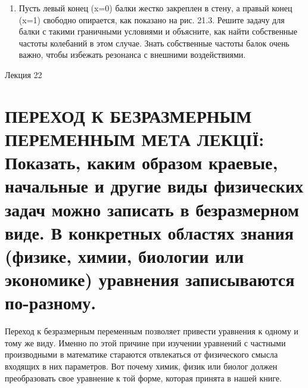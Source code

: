 \documentclass[
  ukrainian,
]{article}
\providecommand{\tightlist}{%
  \setlength{\itemsep}{0pt}\setlength{\parskip}{0pt}}
\begin{document}
\begin{enumerate}
\def\labelenumi{\arabic{enumi}.}
\setcounter{enumi}{3}
\tightlist
\item
  Пусть левый конец (x=0) балки жестко закреплен в стену, а правый конец
  (x=1) свободно опирается, как показано на рис. 21.3. Решите задачу для
  балки с такими граничными условиями и объясните, как найти собственные
  частоты колебаний в этом случае. Знать собственные частоты балок очень
  важно, чтобы избежать резонанса с внешними воздействиями.
\end{enumerate}

Лекция 22

\section{ПЕРЕХОД К БЕЗРАЗМЕРНЫМ ПЕРЕМЕННЫМ МЕТА ЛЕКЦІЇ: Показать, каким
образом краевые, начальные и другие виды физических задач можно записать
в безразмерном виде. В конкретных областях знания (физике, химии,
биологии или экономике) уравнения записываются
по-разному.}\label{ux43fux435ux440ux435ux445ux43eux434-ux43a-ux431ux435ux437ux440ux430ux437ux43cux435ux440ux43dux44bux43c-ux43fux435ux440ux435ux43cux435ux43dux43dux44bux43c-ux43cux435ux442ux430-ux43bux435ux43aux446ux456ux457-ux43fux43eux43aux430ux437ux430ux442ux44c-ux43aux430ux43aux438ux43c-ux43eux431ux440ux430ux437ux43eux43c-ux43aux440ux430ux435ux432ux44bux435-ux43dux430ux447ux430ux43bux44cux43dux44bux435-ux438-ux434ux440ux443ux433ux438ux435-ux432ux438ux434ux44b-ux444ux438ux437ux438ux447ux435ux441ux43aux438ux445-ux437ux430ux434ux430ux447-ux43cux43eux436ux43dux43e-ux437ux430ux43fux438ux441ux430ux442ux44c-ux432-ux431ux435ux437ux440ux430ux437ux43cux435ux440ux43dux43eux43c-ux432ux438ux434ux435.-ux432-ux43aux43eux43dux43aux440ux435ux442ux43dux44bux445-ux43eux431ux43bux430ux441ux442ux44fux445-ux437ux43dux430ux43dux438ux44f-ux444ux438ux437ux438ux43aux435-ux445ux438ux43cux438ux438-ux431ux438ux43eux43bux43eux433ux438ux438-ux438ux43bux438-ux44dux43aux43eux43dux43eux43cux438ux43aux435-ux443ux440ux430ux432ux43dux435ux43dux438ux44f-ux437ux430ux43fux438ux441ux44bux432ux430ux44eux442ux441ux44f-ux43fux43e-ux440ux430ux437ux43dux43eux43cux443.}

Переход к безразмерным переменным позволяет привести уравнения к одному
и тому же виду. Именно по этой причине при изучении уравнений с частными
производными в математике стараются отвлекаться от физического смысла
входящих в них параметров. Вот почему химик, физик или биолог должен
преобразовать свое уравнение к той форме, которая принята в нашей книге.
\end{document}
